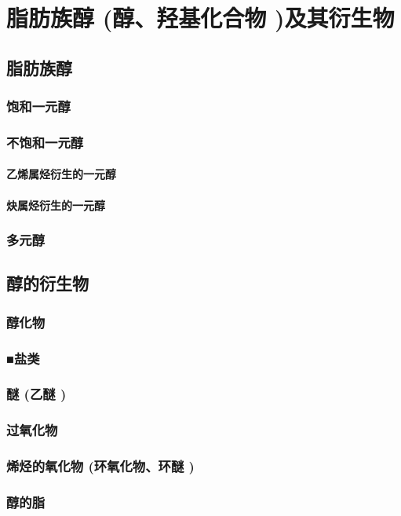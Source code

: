 \documentclass[UTF8]{../03-Chemistry}
\begin{document}
\section{脂肪族醇 (醇、羟基化合物 )及其衍生物}
    \subsection{脂肪族醇}
        \subsubsection{饱和一元醇}
        \subsubsection{不饱和一元醇}
            \paragraph{乙烯属烃衍生的一元醇}
            \paragraph{炔属烃衍生的一元醇}
        \subsubsection{多元醇}
    \subsection{醇的衍生物}
        \subsubsection{醇化物}
        \subsubsection{■盐类}
        \subsubsection{醚 (乙醚 )}
        \subsubsection{过氧化物}
        \subsubsection{烯烃的氧化物 (环氧化物、环醚 )}
        \subsubsection{醇的脂}
\end{document}
